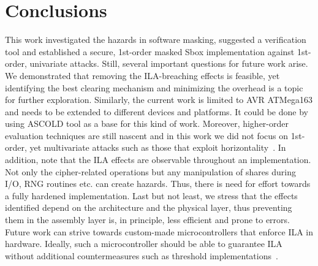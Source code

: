 \section{Conclusions} \label{sec:conclusions}

This work investigated the hazards in software masking, suggested a verification tool and established a secure, 1st-order masked Sbox implementation against 1st-order, univariate attacks. Still, several important questions for future work arise. We demonstrated that removing the ILA-breaching effects is feasible, yet identifying the best clearing mechanism and minimizing the overhead is a topic for further exploration. Similarly, the current work is limited to AVR ATMega163 and needs to be extended to different devices and platforms. It could be done by using ASCOLD tool as a base for this kind of work.  Moreover, higher-order evaluation techniques are still nascent and in this work we did not focus on 1st-order, yet multivariate attacks such as those that exploit horizontality~\cite{DBLP:conf/ches/BattistelloCPZ16}. In addition, note that the ILA effects are observable throughout an implementation. Not only the cipher-related operations but any manipulation of shares during I/O, RNG routines etc. can create hazards. Thus, there is need for effort towards a fully hardened implementation. Last but not least, we stress that the effects identified depend on the architecture and the physical layer, thus preventing them in the assembly layer is, in principle, less efficient and prone to errors. Future work can strive towards custom-made microcontrollers that enforce ILA in hardware. Ideally, such a microcontroller should be able to guarantee ILA without additional countermeasures such as threshold implementations~\cite{DBLP:conf/icics/NikovaRR06}.  